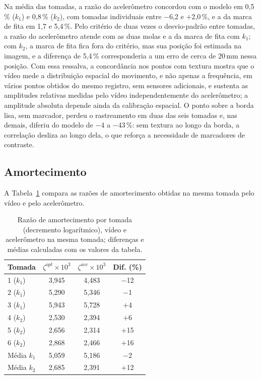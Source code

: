 \documentclass[a4paper,10pt,twocolumn]{article}
\begin{document}
Na média das tomadas, a razão do acelerômetro concordou com o modelo em 0,5\,\% ($k_1$) e 0,8\,\% ($k_2$), com tomadas individuais entre $-$6,2 e $+$2,0\,\%, e a da marca de fita em 1,7 e 5,4\,\%. Pelo critério de duas vezes o desvio-padrão entre tomadas, a razão do acelerômetro atende com as duas molas e a da marca de fita com $k_1$; com $k_2$, a marca de fita fica fora do critério, mas sua posição foi estimada na imagem, e a diferença de 5,4\,\% corresponderia a um erro de cerca de 20\,mm nessa posição. Com essa ressalva, a concordância nos pontos com textura mostra que o vídeo mede a distribuição espacial do movimento, e não apenas a frequência, em vários pontos obtidos do mesmo registro, sem sensores adicionais, e sustenta as amplitudes relativas medidas pelo vídeo independentemente do acelerômetro; a amplitude absoluta depende ainda da calibração espacial. O ponto sobre a borda lisa, sem marcador, perdeu o rastreamento em duas das seis tomadas e, nas demais, diferiu do modelo de $-$4 a $-$43\,\%: sem textura ao longo da borda, a correlação desliza ao longo dela, o que reforça a necessidade de marcadores de contraste.

\subsection{Amortecimento}
\label{sec:res_amortecimento}

A Tabela~\ref{tab:res_amortecimento} compara as razões de amortecimento obtidas na mesma tomada pelo vídeo e pelo acelerômetro.

\begin{table}[H]
    \centering
    \caption{Razão de amortecimento por tomada (decremento logarítmico), vídeo e acelerômetro na mesma tomada; diferenças e médias calculadas com os valores da tabela.}
    \label{tab:res_amortecimento}
    \small
    \begin{tabularx}{\columnwidth}{X c c c}
        \toprule
        \textbf{Tomada} & \textbf{$\zeta^{opt} \times 10^3$} & \textbf{$\zeta^{acc} \times 10^3$} & \textbf{Dif. (\%)} \\
        \midrule
        1 ($k_1$) & 3,945 & 4,483 & $-$12 \\
        2 ($k_1$) & 5,290 & 5,346 & $-$1 \\
        3 ($k_1$) & 5,943 & 5,728 & $+$4 \\
        4 ($k_2$) & 2,530 & 2,394 & $+$6 \\
        5 ($k_2$) & 2,656 & 2,314 & $+$15 \\
        6 ($k_2$) & 2,868 & 2,466 & $+$16 \\
        \midrule
        Média $k_1$ & 5,059 & 5,186 & $-$2 \\
        Média $k_2$ & 2,685 & 2,391 & $+$12 \\
        \bottomrule
    \end{tabularx}
\end{table}
\end{document}
